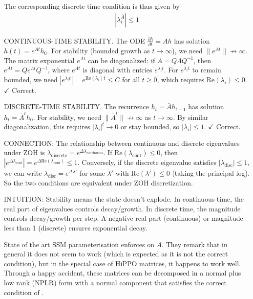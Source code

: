 The corresponding discrete time condition is thus given by
\begin{align}
    \label{eq:discrete_stability}
    |\lambda^{\overline{A}}_i| \leq 1
\end{align}

\begin{ThomasAnnotation}
  CONTINUOUS-TIME STABILITY. The ODE $\frac{\partial h}{\partial t} = Ah$ has solution $h(t) = e^{At}h_0$. For stability (bounded growth as $t \to \infty$), we need $\|e^{At}\| \not\to \infty$. The matrix exponential $e^{At}$ can be diagonalized: if $A = Q \Lambda Q^{-1}$, then $e^{At} = Q e^{\Lambda t} Q^{-1}$, where $e^{\Lambda t}$ is diagonal with entries $e^{\lambda_i t}$. For $e^{\lambda_i t}$ to remain bounded, we need $|e^{\lambda_i t}| = e^{\mathrm{Re}(\lambda_i) t} \leq C$ for all $t \geq 0$, which requires $\mathrm{Re}(\lambda_i) \leq 0$. $\checkmark$ Correct.
  
  DISCRETE-TIME STABILITY. The recurrence $h_t = \overline{A}h_{t-1}$ has solution $h_t = \overline{A}^t h_0$. For stability, we need $\|\overline{A}^t\| \not\to \infty$ as $t \to \infty$. By similar diagonalization, this requires $|\lambda_i|^t \to 0$ or stay bounded, so $|\lambda_i| \leq 1$. $\checkmark$ Correct.
  
  CONNECTION: The relationship between continuous and discrete eigenvalues under ZOH is $\lambda_{\text{discrete}} = e^{\Delta \lambda_{\text{continuous}}}$. If $\mathrm{Re}(\lambda_{\text{cont}}) \leq 0$, then $|e^{\Delta \lambda_{\text{cont}}}| = e^{\Delta \mathrm{Re}(\lambda_{\text{cont}})} \leq 1$. Conversely, if the discrete eigenvalue satisfies $|\lambda_{\text{disc}}| \leq 1$, we can write $\lambda_{\text{disc}} = e^{\Delta \lambda'}$ for some $\lambda'$ with $\mathrm{Re}(\lambda') \leq 0$ (taking the principal log). So the two conditions are equivalent under ZOH discretization.
  
  INTUITION: Stability means the state doesn't explode. In continuous time, the real part of eigenvalues controls decay/growth. In discrete time, the magnitude controls decay/growth per step. A negative real part (continuous) or magnitude less than 1 (discrete) ensures exponential decay.
\end{ThomasAnnotation}

State of the art SSM parameterisation enforces  on $A$. They remark that in general it does not seem to work (which is expected as it is not the correct condition), but in the special case of HiPPO matrices, it happens to work well. Through a happy accident, these matrices can be decomposed in a normal plus low rank (NPLR) form with a normal component that satisfies the correct condition of .

